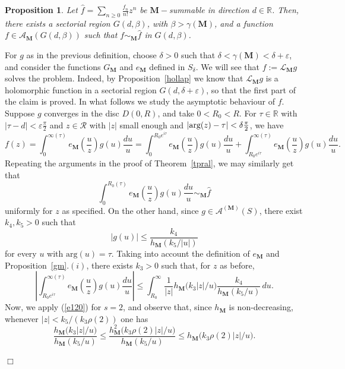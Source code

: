 \documentclass[11pt,a4paper,leqno]{article}
\theoremstyle{plain}
\newtheorem{prop}[theo]{Proposition}
\theoremstyle{definition}
\newenvironment{proof1}{\medskip\par\noindent{\bf Proof}}{\hfill $\Box$
\medskip\par}
\def\R{\mathbb{R}}
\def\bM{\boldsymbol{M}}
\begin{document}
\begin{prop}
Let $\hat{f}=\sum_{n\ge 0}\displaystyle\frac{f_n}{n!}z^n$ be $\bM-$summable in direction $d\in\R$.
Then, there exists a sectorial region
$G(d,\beta)$, with $\beta>\gamma(\bM)$, and a function $f\in\mathcal{A}_{\bM}(G(d,\beta))$ such that $f\sim_{\bM}\hat{f}$ in $G(d,\beta)$.
\end{prop}
\begin{proof1}
For $g$ as in the previous definition, choose $\delta>0$ such that $\delta<\gamma(\bM)<\delta+\varepsilon$, and consider the functions $G_{\bM}$ and $e_{\bM}$ defined in $S_{\delta}$. We will see that
$f:=\mathcal{L}_{\bM}g$ solves the problem. Indeed, by Proposition~\ref{hollap} we know that $\mathcal{L}_{\bM}g$ is a holomorphic function
in a sectorial region $G(d,\delta+\varepsilon)$, so that the first part of the claim is proved. In what follows we study the asymptotic behaviour of $f$. Suppose $g$ converges in the disc $D(0,R)$, and take
$0<R_0<R$. For $\tau\in\R$ with $|\tau-d|<\varepsilon\frac{\pi}{2}$ and $z\in\mathcal{R}$ with $|z|$ small enough and $|\hbox{arg}(z)-\tau|<\delta\frac{\pi}{2}$, we have
$$
f(z)=\int_{0}^{\infty(\tau)}e_{\bM}\left(\frac{u}{z}\right)g(u)\frac{du}{u}=
\int_{0}^{R_0e^{i\tau}}e_{\bM}\left(\frac{u}{z}\right)g(u)\frac{du}{u} +
\int_{R_0e^{i\tau}}^{\infty(\tau)} e_{\bM}\left(\frac{u}{z}\right)g(u)\frac{du}{u}.$$
Repeating the arguments in the proof of Theorem~\ref{tpral}, we may similarly get that
$$
\int_{0}^{R_0(\tau)}e_{\bM}\left(\frac{u}{z}\right)g(u)\frac{du}{u} \sim_{\bM}\hat{f}
$$
uniformly for $z$ as specified. On the other hand, since $g\in\mathcal{A}^{(\bM)}(S)$, there exist $k_4,k_5>0$ such that
$$
|g(u)|\le\frac{k_4}{h_{\bM}(k_5/|u|)}
$$
for every $u$ with $\mathrm{arg}(u)=\tau$. Taking into account the definition of $e_{\bM}$ and Proposition~\ref{gm}.$(i)$, there exists $k_3>0$ such that, for $z$ as before,
\begin{equation}\label{boundG2_1}
\left|\int_{R_0e^{i\tau}}^{\infty(\tau)} e_{\bM}\left(\frac{u}{z}\right)g(u)\frac{du}{u}\right|\le
\int_{R_0}^{\infty}\frac{1}{|z|}h_{\bM}\big(k_3|z|/u\big)
\frac{k_4}{h_{\bM}(k_5/u)}\,du.
\end{equation}
Now, we apply (\ref{e120}) for $s=2$, and observe that, since $h_{\bM}$ is non-decreasing, whenever $|z|<k_5/(k_3\rho(2))$ one has
\begin{equation}\label{boundG2_2}
\frac{h_{\bM}\big(k_3|z|/u\big)}{h_{\bM}(k_5/u)}\le
\frac{h^2_{\bM}\big(k_3\rho(2)|z|/u\big)}{h_{\bM}(k_5/u)}\le
h_{\bM}\big(k_3\rho(2)|z|/u\big).
\end{equation}

\end{proof1}
\end{document}
